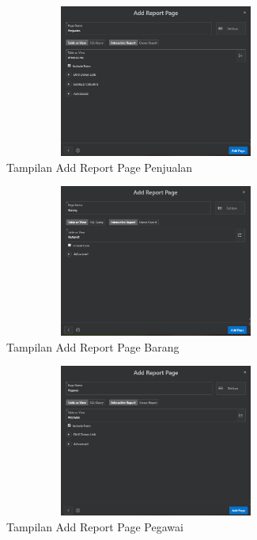 \documentclass[a4paper, 12pt]{article}
\begin{document}
\begin{enumerate}
            \begin{figure}[!htbp]
            \centering
            \includegraphics[width=10cm,height=5cm]{gambar/7-createapp.PNG}
            \caption{Tampilan Add Report Page Penjualan}
            \label{penanda}
            \end{figure}
            
            \begin{figure}[!htbp]
            \centering
            \includegraphics[width=10cm,height=5cm]{gambar/5-createapp.PNG}
            \caption{Tampilan Add Report Page Barang}
            \label{penanda}
            \end{figure}
            
            \begin{figure}[!htbp]
            \centering
            \includegraphics[width=10cm,height=5cm]{gambar/6-createapp.PNG}
            \caption{Tampilan Add Report Page Pegawai}
            \label{penanda}
            \end{figure}
            

\end{enumerate}
\end{document}
